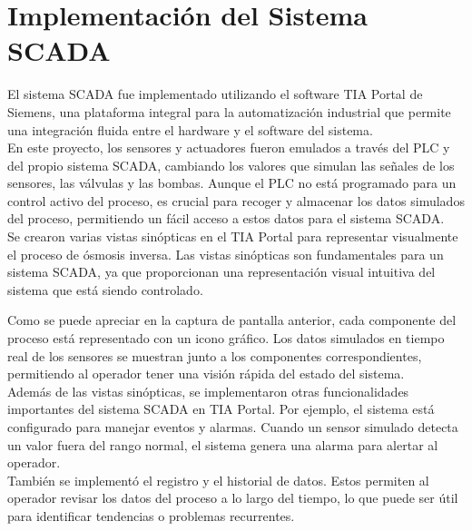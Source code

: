 \chapter{Implementación del Sistema SCADA}

El sistema SCADA fue implementado utilizando el software TIA Portal de Siemens, una plataforma integral para la automatización industrial que permite una integración fluida entre el hardware y el software del sistema.\\

En este proyecto, los sensores y actuadores fueron emulados a través del PLC y del propio sistema SCADA, cambiando los valores que simulan las señales de los sensores, las válvulas y las bombas. Aunque el PLC no está programado para un control activo del proceso, es crucial para recoger y almacenar los datos simulados del proceso, permitiendo un fácil acceso a estos datos para el sistema SCADA.\\

Se crearon varias vistas sinópticas en el TIA Portal para representar visualmente el proceso de ósmosis inversa. Las vistas sinópticas son fundamentales para un sistema SCADA, ya que proporcionan una representación visual intuitiva del sistema que está siendo controlado.\\


Como se puede apreciar en la captura de pantalla anterior, cada componente del proceso está representado con un icono gráfico. Los datos simulados en tiempo real de los sensores se muestran junto a los componentes correspondientes, permitiendo al operador tener una visión rápida del estado del sistema.\\

Además de las vistas sinópticas, se implementaron otras funcionalidades importantes del sistema SCADA en TIA Portal. Por ejemplo, el sistema está configurado para manejar eventos y alarmas. Cuando un sensor simulado detecta un valor fuera del rango normal, el sistema genera una alarma para alertar al operador.\\

También se implementó el registro y el historial de datos. Estos permiten al operador revisar los datos del proceso a lo largo del tiempo, lo que puede ser útil para identificar tendencias o problemas recurrentes.\\


